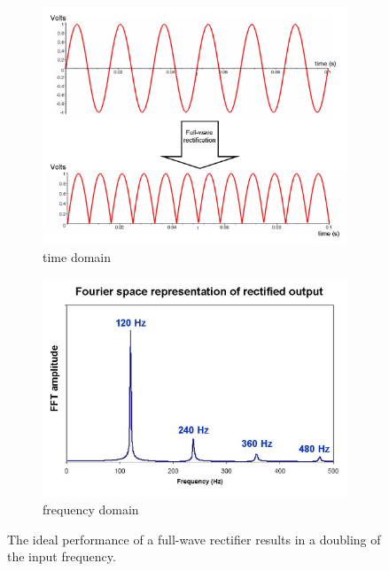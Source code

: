 \documentclass{article}
\begin{document}
\begin{figure}
 \begin{center}
  \begin{subfigure}[b]{0.48\textwidth}
   \begin{center}
    \includegraphics[width=\textwidth]{pics/frequency_multiplier_time}
   \end{center}
   \caption{time domain}
  \end{subfigure}
  \begin{subfigure}[b]{0.48\textwidth}
   \begin{center}
    \includegraphics[width=\textwidth]{pics/frequency_multiplier_FFT}
   \end{center}
   \caption{frequency domain}
  \end{subfigure}
 \end{center}
\caption{The ideal performance of a full-wave rectifier results in a doubling of the input frequency.}
\label{fig:frequency-multiplier}
\end{figure}
\end{document}
